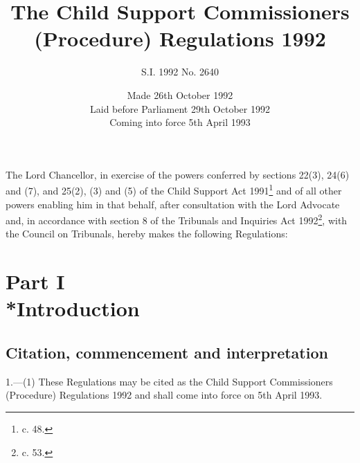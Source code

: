 \documentclass[a4paper]{article}
\title{The Child Support Commissioners (Procedure) Regulations 1992}
\author{S.I. 1992 No. 2640}
\date{Made 26th October 1992\\Laid before Parliament 29th October 1992\\Coming into force 5th April 1993}
\newcommand{\parthead}{}
\begin{document}
\maketitle

\noindent
The Lord Chancellor, in exercise of the powers conferred by sections 22(3), 24(6) and (7), and 25(2), (3) and (5) of the Child Support Act 1991\footnote{ c. 48.} and of all other powers enabling him in that behalf, after consultation with the Lord Advocate and, in accordance with section 8 of the Tribunals and Inquiries Act 1992\footnote{ c. 53.}, with the Council on Tribunals, hereby makes the following Regulations:

{\sloppy

\tableofcontents

}

\setcounter{secnumdepth}{-2}

\section[Part I --- Introduction]{Part I\\*Introduction}

\subsection[1. Citation, commencement and interpretation]{Citation, commencement and interpretation}

\renewcommand\parthead{--- Part I}

1.—(1) These Regulations may be cited as the Child Support Commissioners (Procedure) Regulations 1992 and shall come into force on 5th April 1993.
\end{document}
